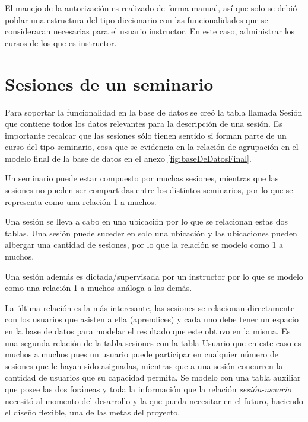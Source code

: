 	El manejo de la autorización es realizado de forma manual, así que solo se debió poblar una estructura del tipo diccionario con las funcionalidades que se consideraran necesarias para el usuario instructor. En este caso, administrar los cursos de los que es instructor.
	

	\section{Sesiones de un seminario} %
	\label{sec:sesiones_de_un_seminario}
	
	Para soportar la funcionalidad en la base de datos se creó la tabla llamada Sesión que contiene todos los datos relevantes para la descripción de una sesión. Es importante recalcar que las sesiones sólo tienen sentido si forman parte de un curso del tipo seminario, cosa que se evidencia en la relación de agrupación en el modelo final de la base de datos en el anexo \ref{fig:baseDeDatosFinal}. 

	Un seminario puede estar compuesto por muchas sesiones, mientras que las sesiones no pueden ser compartidas entre los distintos seminarios, por lo que se representa como una relación 1 a muchos. 

	Una sesión se lleva a cabo en una ubicación por lo que se relacionan estas dos tablas. Una sesión puede suceder en solo una ubicación y las ubicaciones pueden albergar una cantidad de sesiones, por lo que la relación se modelo como 1 a muchos.

	Una sesión además es dictada/supervisada por un instructor por lo que se modelo como una relación 1 a muchos análoga a las demás.

	La última relación es la más interesante, las sesiones se relacionan directamente con los usuarios que asisten a ella (aprendices) y cada uno debe tener un espacio en la base de datos para modelar el resultado que este obtuvo en la misma. Es una segunda relación de la tabla sesiones con la tabla Usuario que en este caso es muchos a muchos pues un usuario puede participar en cualquier número de sesiones que le hayan sido asignadas, mientras que a una sesión concurren la cantidad de usuarios que su capacidad permita. Se modelo con una tabla auxiliar que posee las dos foráneas y toda la información que la relación \emph{sesión-usuario} necesitó al momento del desarrollo y la que pueda necesitar en el futuro, haciendo el diseño flexible, una de las metas del proyecto.

